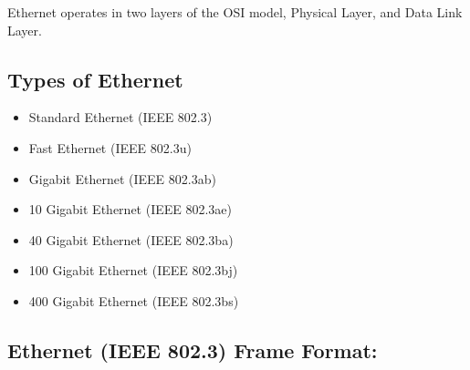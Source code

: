 \documentclass[12pt]{article}
\begin{document}
Ethernet operates in two layers of the OSI model, Physical Layer, and Data Link Layer.

\subsection*{Types of Ethernet}
\begin{itemize}
\item Standard Ethernet (IEEE 802.3)
\item Fast Ethernet (IEEE 802.3u)
\item Gigabit Ethernet (IEEE 802.3ab)
\item 10 Gigabit Ethernet (IEEE 802.3ae)
\item 40 Gigabit Ethernet (IEEE 802.3ba)
\item 100 Gigabit Ethernet (IEEE 802.3bj)
\item 400 Gigabit Ethernet (IEEE 802.3bs)
\end{itemize}

\subsection*{Ethernet (IEEE 802.3) Frame Format:}
\end{document}
